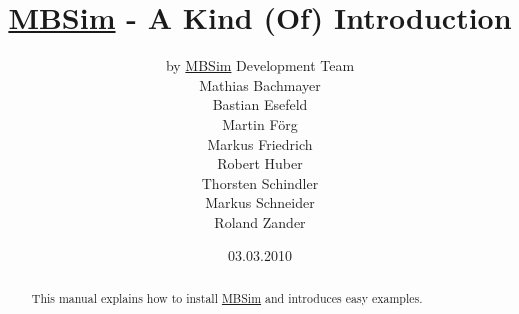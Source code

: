 \documentclass[fleqn,11pt]{article}
\newcommand{\MBSim}{\href{http://mbsim.berlios.de}{\textsf{MBSim}}}
\begin{document}
\title{\MBSim{} - A Kind (Of) Introduction}
\author{by \MBSim{} Development Team\\
  Mathias Bachmayer\\
  Bastian Esefeld\\
  Martin F\"org\\
  Markus Friedrich\\
  Robert Huber\\
  Thorsten Schindler\\
  Markus Schneider\\
  Roland Zander}
\date{03.03.2010}
\maketitle

\begin{abstract}
  This manual explains how to install \MBSim{} and introduces easy examples.
\end{abstract}

\noindent\hrulefill
\tableofcontents






\appendix





\end{document}
